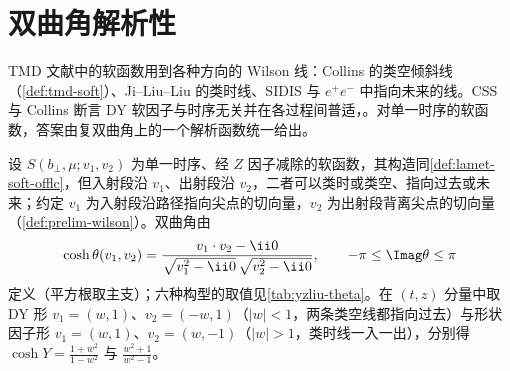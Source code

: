 \section{双曲角解析性}\label{sec:yzliu-analyticity}

TMD 文献中的软函数用到各种方向的 Wilson 线：Collins 的类空倾斜线（\cref{def:tmd-soft}）、Ji--Liu--Liu 的类时线、SIDIS 与 $e^+e^-$ 中指向未来的线。CSS 与 Collins 断言 DY 软因子与时序无关并在各过程间普适\cite{CollinsMetz2004}，\cite[第~13~章]{Collins2011}。对单一时序的软函数，答案由复双曲角上的一个解析函数统一给出。

\begin{definition}[双曲角与六种构型]\label{def:yzliu-hyperbolic-angle}
设 $S(b_\perp,\mu;v_1,v_2)$ 为单一时序、经 $Z$ 因子减除的软函数，其构造同\cref{def:lamet-soft-offlc}，但入射段沿 $v_1$、出射段沿 $v_2$，二者可以类时或类空、指向过去或未来\cite[式~(93)]{Liu:2022nnk}；约定 $v_1$ 为入射段沿路径指向尖点的切向量，$v_2$ 为出射段背离尖点的切向量（\cref{def:prelim-wilson}）。双曲角由
\begin{equation}\label{eq:yzliu-theta}
\cosh\theta(v_1,v_2)=\frac{v_1\cdot v_2-\ii0}{\sqrt{v_1^2-\ii0}\,\sqrt{v_2^2-\ii0}},\qquad -\pi\le\Imag\theta\le\pi
\end{equation}
定义（平方根取主支）；六种构型的取值见\cref{tab:yzliu-theta}。在 $(t,z)$ 分量中取 DY 形 $v_1=(w,1)$、$v_2=(-w,1)$（$|w|<1$，两条类空线都指向过去）与形状因子形 $v_1=(w,1)$、$v_2=(w,-1)$（$|w|>1$，类时线一入一出），分别得 $\cosh Y=\frac{1+w^2}{1-w^2}$ 与 $\frac{w^2+1}{w^2-1}$。%
\end{definition}


